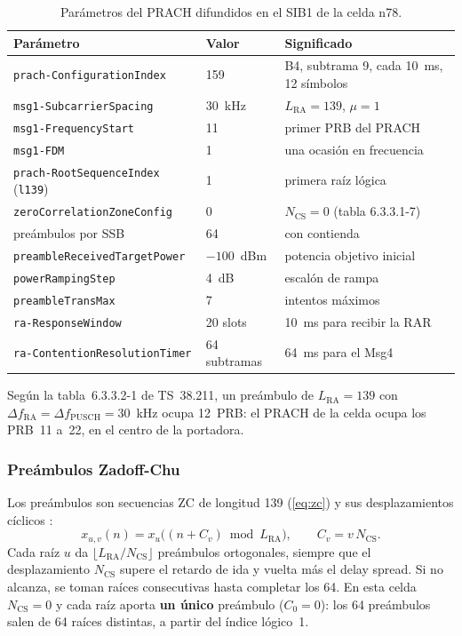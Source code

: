 \begin{table}[htbp]
\centering
\caption{Parámetros del PRACH difundidos en el SIB1 de la celda n78.}
\label{tab:prach}
\begin{tabular}{lll}
\toprule
Parámetro & Valor & Significado \\
\midrule
\texttt{prach-ConfigurationIndex} & 159 & B4, subtrama 9, cada 10~ms, 12 símbolos \\
\texttt{msg1-SubcarrierSpacing} & 30~kHz & $L_\text{RA}=139$, $\mu=1$ \\
\texttt{msg1-FrequencyStart} & 11 & primer PRB del PRACH \\
\texttt{msg1-FDM} & 1 & una ocasión en frecuencia \\
\texttt{prach-RootSequenceIndex} (\texttt{l139}) & 1 & primera raíz lógica \\
\texttt{zeroCorrelationZoneConfig} & 0 & $N_\text{CS}=0$ (tabla 6.3.3.1-7) \\
preámbulos por SSB & 64 & con contienda \\
\texttt{preambleReceivedTargetPower} & $-100$~dBm & potencia objetivo inicial \\
\texttt{powerRampingStep} & 4~dB & escalón de rampa \\
\texttt{preambleTransMax} & 7 & intentos máximos \\
\texttt{ra-ResponseWindow} & 20 slots & 10~ms para recibir la RAR \\
\texttt{ra-ContentionResolutionTimer} & 64 subtramas & 64~ms para el Msg4 \\
\bottomrule
\end{tabular}
\end{table}

Según la tabla~6.3.3.2-1 de TS~38.211, un preámbulo de $L_\text{RA}=139$ con $\Delta f_\text{RA}=\Delta f_\text{PUSCH}=30$~kHz ocupa 12~PRB: el PRACH de la celda ocupa los PRB~11 a~22, en el centro de la portadora.

\subsubsection{Preámbulos Zadoff-Chu}
Los preámbulos son secuencias ZC de longitud 139 (\cref{eq:zc}) y sus desplazamientos cíclicos \cite[§6.3.3.1]{ts38211}:
\begin{equation}
x_{u,v}(n) = x_u\big((n + C_v)\bmod L_\text{RA}\big),\qquad C_v = v\,N_\text{CS}.
\end{equation}
Cada raíz $u$ da $\lfloor L_\text{RA}/N_\text{CS}\rfloor$ preámbulos ortogonales, siempre que el desplazamiento $N_\text{CS}$ supere el retardo de ida y vuelta más el delay spread. Si no alcanza, se toman raíces consecutivas hasta completar los 64. En esta celda $N_\text{CS}=0$ y cada raíz aporta \textbf{un único} preámbulo ($C_0=0$): los 64 preámbulos salen de 64 raíces distintas, a partir del índice lógico~1.

